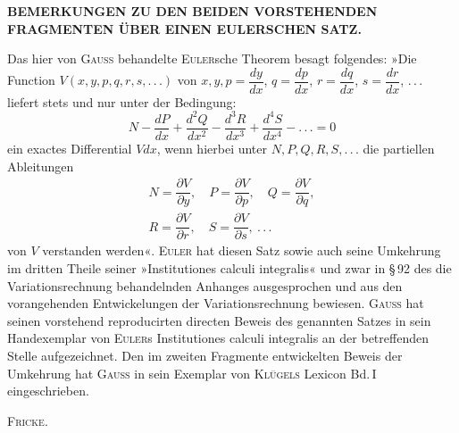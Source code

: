 \begin{center}
\textbf{BEMERKUNGEN ZU DEN BEIDEN VORSTEHENDEN FRAGMENTEN ÜBER EINEN EULERSCHEN SATZ.}
\end{center}

\noindent\hspace*{\parindent}Das hier von \textsc{Gauss} behandelte \textsc{Euler}sche Theorem besagt folgendes: »Die Function
$V(x, y, p, q, r, s, .\,.\,.)$ von $x, y, p=\dfrac{dy}{dx}$, $q=\dfrac{dp}{dx}$, $r=\dfrac{dq}{dx}$, $s=\dfrac{dr}{dx}$, $.\,.\,.$
liefert stets und nur unter der Bedingung:
\[
N-\dfrac{dP}{dx}+\dfrac{d^2Q}{dx^2}-\dfrac{d^3R}{dx^3}+\dfrac{d^4S}{dx^4}-.\,.\,.=0
\]
ein exactes Differential $Vdx$, wenn hierbei unter $N, P, Q, R, S, .\,.\,.$ die partiellen Ableitungen
\[
\begin{aligned}N=\dfrac{\partial V}{\partial y},\quad P=\dfrac{\partial V}{\partial p},\quad Q=\dfrac{\partial V}{\partial q},\\ R=\dfrac{\partial V}{\partial r},\quad S=\dfrac{\partial V}{\partial s},\ .\,.\,.
\end{aligned}
\]
von $V$ verstanden werden«. \textsc{Euler} hat diesen Satz sowie auch seine Umkehrung im dritten Theile
seiner »Institutiones calculi integralis« und zwar in \S\,92 des die Variationsrechnung behandelnden
Anhanges ausgesprochen und aus den vorangehenden Entwickelungen der Variationsrechnung bewiesen.
\textsc{Gauss} hat seinen vorstehend reproducirten directen Beweis des genannten Satzes in sein
Handexemplar von \textsc{Euler}s Institutiones calculi integralis an der betreffenden Stelle
aufgezeichnet. Den im zweiten Fragmente entwickelten Beweis der Umkehrung hat \textsc{Gauss} in sein
Exemplar von \textsc{Klügels} Lexicon Bd.\,I eingeschrieben.

\begin{flushright}
\textsc{Fricke}.
\end{flushright}

